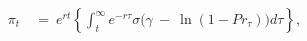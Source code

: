 \begin{equation}
\begin{split}
    \pi_{t} \
    & = \ e^{rt} \left\{ \int_{t}^{\infty} e^{-r\tau} \sigma \big( \gamma \ - \ \ln(1 - Pr_{\tau}) \big) d\tau \right\},
\end{split}
\label{Equation:Social-Planners-Problem_Euler-Equation}
\end{equation}